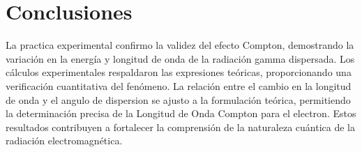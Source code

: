 \documentclass[letterpaper, 12pt]{article}
\begin{document}
\section{Conclusiones}

La practica experimental confirmo la validez del efecto
Compton, demostrando la variación en la energía y longitud
de onda de la radiación gamma dispersada. Los cálculos
experimentales respaldaron las expresiones teóricas,
proporcionando una verificación cuantitativa del fenómeno.
La relación entre el cambio en la longitud de onda y el
angulo de dispersion se ajusto a la formulación teórica,
permitiendo la determinación precisa de la Longitud de Onda
Compton para el electron. Estos resultados contribuyen a
fortalecer la comprensión de la naturaleza cuántica de la
radiación electromagnética.

\newpage

\printbibliography
\end{document}
